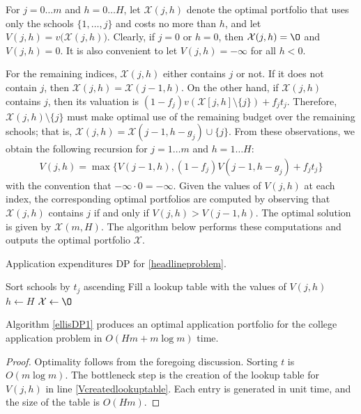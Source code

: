For $j = 0 \dots m$ and $h = 0 \dots H$, let $\mathcal{X}(j, h)$ denote the optimal portfolio that uses only the schools $\{ 1, \dots, j\}$ and costs no more than $h$, and let $V(j,h) = v\bigl(\mathcal{X}(j, h)\bigr)$. Clearly, if $j=0$ or $h=0$, then $\mathcal{X}(j, h) = \O$ and $V(j, h) = 0$. It is also convenient to let $V(j, h) = -\infty$ for all $h < 0$.

For the remaining indices, $\mathcal{X}(j, h)$ either contains $j$ or not. If it does not contain $j$, then $\mathcal{X}(j, h) = \mathcal{X}(j-1, h)$. On the other hand, if  $\mathcal{X}(j, h)$ contains $j$, then its valuation is $(1 - f_j) v(\mathcal{X}[j, h]\setminus \{j\}) + f_j t_j$. Therefore, $\mathcal{X}(j, h)\setminus \{j\}$ must make optimal use of the remaining budget over the remaining schools; that is, $\mathcal{X}(j, h) = \mathcal{X}(j-1, h - g_j) \cup\{j\}$. From these observations, we obtain the following recursion for $ j = 1\dots m$ and $h = 1\dots H$:
\begin{align}
V(j, h) = \max\bigl\{ V(j-1, h), (1 - f_j) V(j-1, h-g_j) + f_j t_j \bigr\}
\end{align}
with the convention that $ -\infty \cdot 0 = -\infty$. Given the values of $V(j, h)$ at each index, the corresponding optimal portfolios are computed by observing that $\mathcal{X}(j, h)$ contains $j$ if and only if $V(j, h) > V(j-1, h)$. The optimal solution is given by $\mathcal{X}(m, H)$. The algorithm below performs these computations and outputs the optimal portfolio $\mathcal{X}$. 

\begin{algorithm}[h] 
\caption{Application expenditures DP for \eqref{headlineproblem}.} \label{ellisDP1}
Sort schools by $t_j$ ascending\;
Fill a lookup table with the values of $V(j, h)$\; \label{Vcreatedlookuptable}
$h \gets H$\;
$\mathcal{X} \gets \O$\;
\;
\end{algorithm}

\begin{theorem}
Algorithm \ref{ellisDP1} produces an optimal application portfolio for the college application problem in $O(H m + m \log m)$ time.
\end{theorem}

\begin{proof}
Optimality follows from the foregoing discussion. Sorting $t$ is $O(m \log m)$. The bottleneck step is the creation of the lookup table for $V(j, h)$ in line \ref{Vcreatedlookuptable}. Each entry is generated in unit time, and the size of the table is $O(Hm)$.
\end{proof}

